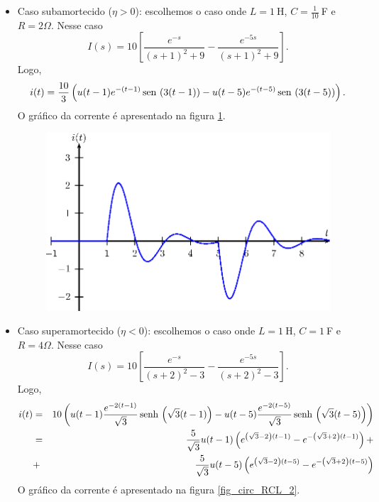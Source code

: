 \begin{itemize}
 \item Caso subamortecido ($\eta>0$): escolhemos o caso onde $L=1\ \!$H, $C=\frac{1}{10}\ \!$F e $R=2\Omega$. Nesse caso
 \begin{equation}
 I(s)=10\left[\frac{e^{-s}}{\left(s+1\right)^2+9}-\frac{e^{-5s}}{\left(s+1\right)^2+9}\right].
 \end{equation}
 Logo,
 \begin{equation}
 i(t)=\frac{10}{3}\left(u(t-1)e^{-(t-1)}\operatorname{sen}\,\left(3 (t-1)\right)-u(t-5) e^{-(t-5)}\operatorname{sen}\,\left(3 (t-5)\right)\right).
 \end{equation}
 O gráfico da corrente é apresentado na figura \ref{fig_circ_RCL_1}.
\begin{figure}[!ht]
\begin{center}

\includegraphics{cap_dirac_conv/pics/figura_8}\end{center}
\caption{\label{fig_circ_RCL_1}}
\end{figure}
 \item Caso superamortecido ($\eta<0$): escolhemos o caso onde $L=1\ \!$H, $C=1\ \!$F e $R=4\Omega$. Nesse caso
 \begin{equation}
 I(s)=10\left[\frac{e^{-s}}{\left(s+2\right)^2-3 }-\frac{e^{-5s}}{\left(s+2\right)^2-3}\right].
 \end{equation}
 Logo,
 \begin{eqnarray*}
 i(t)&=&10\left(u(t-1)\frac{e^{-2(t-1)}}{ \sqrt{3}}\operatorname{senh}\,\left(\sqrt{3} (t-1)\right)-u(t-5)\frac{e^{-2(t-5)}}{\sqrt{3} }\operatorname{senh}\,\left(\sqrt{3}  (t-5)\right)\right)\\
 &=&\frac{5}{\sqrt{3}}u(t-1)\left(e^{\left(\sqrt{3}-2\right) (t-1)}-e^{-\left(\sqrt{3}+2\right) (t-1)}\right)+\\
 &+&\frac{5}{\sqrt{3}}u(t-5)\left(e^{\left(\sqrt{3}-2\right) (t-5)}-e^{-\left(\sqrt{3}+2\right) (t-5)}\right)
 \end{eqnarray*}
 O gráfico da corrente é apresentado na figura \ref{fig_circ_RCL_2}.
\begin{figure}[!ht]
\begin{center}


\end{center}
\end{figure}
\end{itemize}

